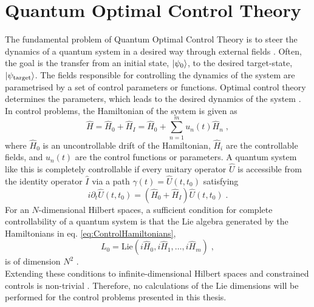 \chapter{Quantum Optimal Control Theory}
The fundamental problem of Quantum Optimal Control Theory is to steer the dynamics of a quantum system in a desired way through external fields \cite{Rice2000,Shapiro2003}. Often, the goal is the transfer from an initial state, $\ket{\psi_0}$, to the desired target-state, $\ket{\psi_{\mathrm{target}}}$. The fields responsible for controlling the dynamics of the system are parametrised by a set of control parameters or functions. Optimal control theory determines the parameters, which leads to the desired dynamics of the system \cite{Werschnik2007}.\\ 
In control problems, the Hamiltonian of the system is given as
\begin{equation}
	\hat{H} = \hat{H}_0 + \hat{H}_I = \hat{H}_0 + \sum_{n = 1}^{m} u_n(t) \hat{H}_n \; ,
	\label{eq:ControlHamiltonians}
\end{equation} 
where $\hat{H}_0$ is an uncontrollable drift of the Hamiltonian, $\hat{H}_i$ are the controllable fields, and $u_n(t)$ are the control functions or parameters. A quantum system like this is completely controllable if every unitary operator $\hat{U}$ is accessible from the identity operator $\hat{I}$ via a path $\gamma (t) = \hat{U}(t, t_0)$ satisfying \cite{Schirmer2001}
\begin{equation}
	i \partial_t \hat{U}(t, t_0) = \left( \hat{H}_0 + \hat{H}_I \right) \hat{U}(t, t_0) \; .
\end{equation} 
For an $N$-dimensional Hilbert spaces, a sufficient condition for complete controllability of a quantum system is that the Lie algebra generated by the Hamiltonians in eq. \eqref{eq:ControlHamiltonians},
\begin{equation}
	L_0 = \mathrm{Lie} \left( i \hat{H}_0, i \hat{H}_1 , \ldots , i \hat{H}_m \right) \; ,
\end{equation}
is of dimension $N^2$ \cite{Ramakrishna1995}.\\
Extending these conditions to infinite-dimensional Hilbert spaces and constrained controls is non-trivial \cite{Huang1983}. Therefore, no calculations of the Lie dimensions will be performed for the control problems presented in this thesis.


